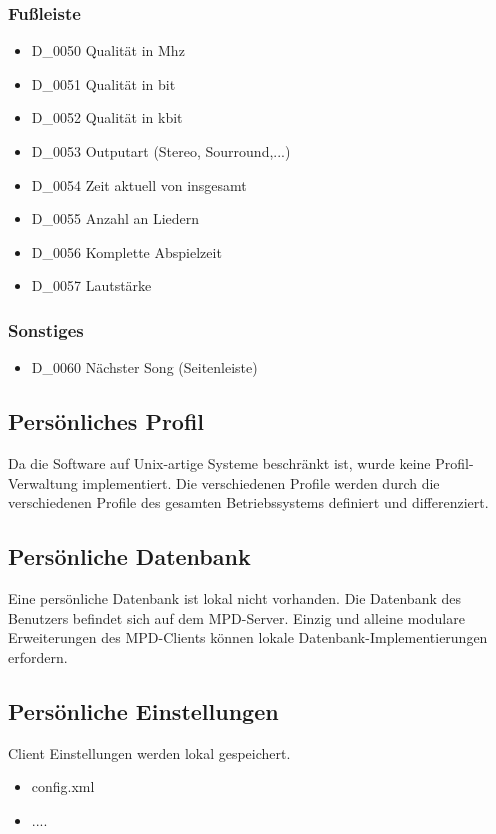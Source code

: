 \subsubsection{Fußleiste}
\begin{itemize}
	\item D\_0050 Qualität in Mhz
	\item D\_0051 Qualität in bit
	\item D\_0052 Qualität in kbit
	\item D\_0053 Outputart (Stereo, Sourround,...)
	\item D\_0054 Zeit aktuell von insgesamt
	\item D\_0055 Anzahl an Liedern
	\item D\_0056 Komplette Abspielzeit
	\item D\_0057 Lautstärke
\end{itemize}
\subsubsection{Sonstiges}
\begin{itemize}
	\item D\_0060 Nächster Song (Seitenleiste)
\end{itemize}
\subsection{Persönliches Profil}
Da die Software auf Unix-artige Systeme beschränkt ist, wurde keine Profil-Verwaltung implementiert. Die
verschiedenen Profile werden durch die verschiedenen Profile des gesamten Betriebssystems definiert und differenziert.
\subsection{Persönliche Datenbank}
Eine persönliche Datenbank ist lokal nicht vorhanden. Die Datenbank des Benutzers befindet sich auf dem MPD-Server.
Einzig und alleine modulare Erweiterungen des MPD-Clients können lokale Datenbank-Implementierungen erfordern.
\subsection{Persönliche Einstellungen}
Client Einstellungen werden lokal gespeichert.
\begin{itemize}
	\item config.xml
	\item ....
\end{itemize}
